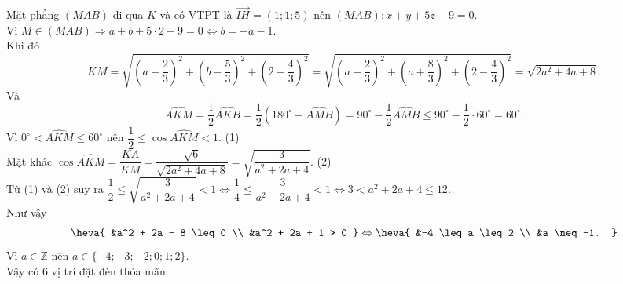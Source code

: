 \begin{ex}
{{
	}
	Mặt phẳng $(MAB)$ đi qua $K$ và có VTPT là $\overrightarrow{IH} = (1; 1; 5)$ nên $(MAB)\colon x + y + 5z - 9 = 0$.\\
	Vì $M \in (MAB) \Rightarrow a + b + 5 \cdot 2 - 9 = 0 \Leftrightarrow b = -a - 1.$\\
	Khi đó
	$$KM = \sqrt{\left(a - \dfrac{2}{3}\right)^2 + \left(b - \dfrac{5}{3}\right)^2 + \left(2 - \dfrac{4}{3}\right)^2} = \sqrt{\left(a - \dfrac{2}{3}\right)^2 + \left(a + \dfrac{8}{3}\right)^2 + \left(2 - \dfrac{4}{3}\right)^2} = \sqrt{2a^2 + 4a + 8}.$$
	Và
	$$\widehat{AKM} = \dfrac{1}{2}\widehat{AKB} = \dfrac{1}{2} \left( 180^{\circ} - \widehat{AMB} \right) = 90^{\circ} - \dfrac{1}{2}\widehat{AMB} \le 90^{\circ} - \dfrac{1}{2} \cdot 60^{\circ} = 60^{\circ}.$$
			Vì $0^{\circ} < \widehat{AKM} \le 60^{\circ}$ nên $\dfrac{1}{2} \leq \cos \widehat{AKM} <1$. \hfill (1)\\
			Mặt khác $\cos \widehat{AKM} = \dfrac{KA}{KM} = \dfrac{\sqrt{6}}{\sqrt{2a^2 + 4a + 8}} = \sqrt{\dfrac{3}{a^2 + 2a + 4}}$. \hfill (2)\\
			Từ (1) và (2) suy ra $\dfrac{1}{2} \le \sqrt{\dfrac{3}{a^2 + 2a + 4}} < 1 \Leftrightarrow \dfrac{1}{4} \le \dfrac{3}{a^2 + 2a + 4} < 1 \Leftrightarrow 3 < a^2 + 2a + 4 \le 12$.\\
			Như vậy
			$$
				\heva{
					&a^2 + 2a - 8 \leq 0 \\
					&a^2 + 2a + 1 > 0
				} \Leftrightarrow
				\heva{
					&-4 \leq a \leq 2 \\
					&a \neq -1.
				}$$
			Vì $a \in \mathbb{Z}$ nên $a \in \{-4; -3; -2; 0; 1; 2\}$.\\
			Vậy có $6$ vị trí đặt đèn thỏa mãn.
		}
\end{ex}

